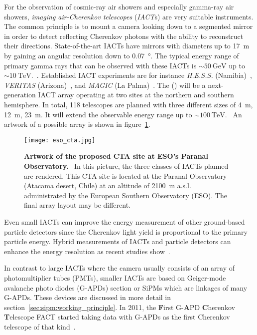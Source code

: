 For the observation of cosmic-ray air showers and especially gamma-ray air showers, \textit{imaging air-Cherenkov telescopes} (\textit{IACT}s) are very suitable instruments. The common principle is to mount a camera looking down to a segmented mirror in order to detect reflecting Cherenkov photons with the ability to reconstruct their directions. State-of-the-art IACTs have mirrors with diameters up to \SI{17}{\meter} by gaining an angular resolution down to \SI{0.07}{\degree}. The typical energy range of primary gamma rays that can be observed with these IACTs is $\sim\SI{50}{\giga\electronvolt}$ up to $\sim\SI{10}{\tera\electronvolt}$.~\cite{iacts:magic}. Established IACT experiments are for instance \textit{H.E.S.S.} (Namibia)~\cite{iacts:hess}, \textit{VERITAS} (Arizona)~\cite{iacts:veritas}, and \textit{MAGIC} (La Palma)~\cite{iacts:magic}. The  () will be a next-generation IACT array operating at two sites at the northern and southern hemisphere. In total, \num{118} telescopes are planned with three different sizes of \SI{4}{\meter}, \SI{12}{\meter}, \SI{23}{\meter}. It will extend the observable energy range up to $\sim\SI{100}{\tera\electronvolt}$.~\cite{iacts:cta} An artwork of a possible array is shown in figure~\ref{cta_artwork}.

\begin{figure}[H]
	\centering
	\texttt{[image: eso\_cta.jpg]}
	\caption[Artwork of the proposed CTA site at ESO's Paranal Observatory]{\textbf{Artwork of the proposed CTA site at ESO's Paranal Observatory.}~\cite{iacts:cta_artwork} In this picture, the three classes of IACTs planned are rendered. This CTA site is located at the Paranal Observatory (Atacama desert, Chile) at an altitude of \SI{2100}{\meter} a.s.l. administrated by the European Southern Observatory (ESO). The final array layout may be different.~\cite{iacts:cta}}
	\label{cta_artwork}
\end{figure}

Even small IACTs can improve the energy measurement of other ground-based particle detectors since the Cherenkov light yield is proportional to the primary particle energy. Hybrid measurements of IACTs and particle detectors can enhance the energy resolution as recent studies show~\cite{iacts:extension}.

In contrast to large IACTs where the camera usually consists of an array of photomultiplier tubes (PMTs), smaller IACTs are based on Geiger-mode avalanche photo diodes (G-APDs) section or SiPMs which are linkages of many G-APDs. These devices are discussed in more detail in section~\ref{sec:sipm:working_principle}. In 2011, the \textbf{F}irst G-\textbf{A}PD \textbf{C}herenkov \textbf{T}elescope FACT started taking data with G-APDs as the first Cherenkov telescope of that kind~\cite{iacts:fact}.

